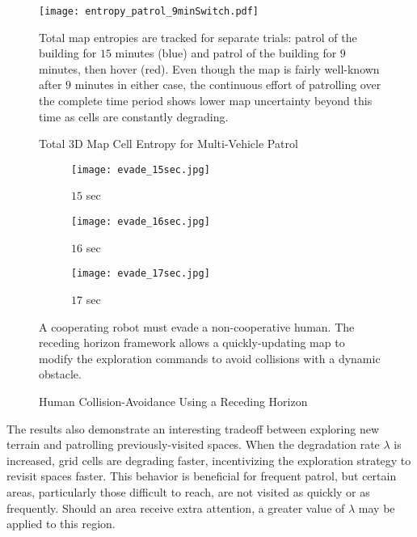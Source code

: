 \begin{figure}
	\centering
	\texttt{[image: entropy\_patrol\_9minSwitch.pdf]}
	\caption{Total 3D Map Cell Entropy for Multi-Vehicle Patrol}
	\medskip
	\small
	Total map entropies are tracked for separate trials: patrol of the building for $15$ minutes (blue) and patrol of the building for $9$ minutes, then hover (red). Even though the map is fairly well-known after $9$ minutes in either case, the continuous effort of patrolling over the complete time period shows lower map uncertainty beyond this time as cells are constantly degrading.
	\label{fig:DegradeExamples}
\end{figure}


\begin{figure}[!t]
\centering
    	\begin{subfigure}[t]{0.3\columnwidth}
           	\centering
          	\texttt{[image: evade\_15sec.jpg]}
        		\caption{$15$ sec}
    	\end{subfigure}
	\hspace*{0.02\textwidth}
    	\begin{subfigure}[t]{0.3\columnwidth}
           	\centering
          	\texttt{[image: evade\_16sec.jpg]}
        		\caption{$16$ sec}
    	\end{subfigure}
	\hspace*{0.02\textwidth}
    	\begin{subfigure}[t]{0.3\columnwidth}
           	\centering
          	\texttt{[image: evade\_17sec.jpg]}
        		\caption{$17$ sec}
    	\end{subfigure}
	\caption{Human Collision-Avoidance Using a Receding Horizon}
	\medskip
	\small
	A cooperating robot must evade a non-cooperative human. The receding horizon framework allows a quickly-updating map to modify the exploration commands to avoid collisions with a dynamic obstacle.
	\label{fig:EvadeHuman}
\end{figure}

The results also demonstrate an interesting tradeoff between exploring new terrain and patrolling previously-visited spaces. When the degradation rate $\lambda$ is increased, grid cells are degrading faster, incentivizing the exploration strategy to revisit spaces faster. This behavior is beneficial for frequent patrol, but certain areas, particularly those difficult to reach, are not visited as quickly or as frequently. Should an area receive extra attention, a greater value of $\lambda$ may be applied to this region.



